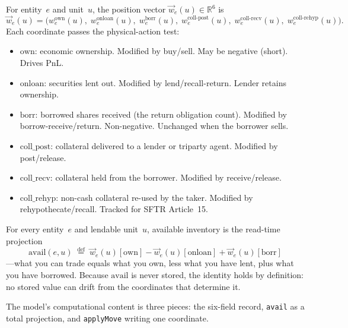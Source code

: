 \begin{definition}
\label{def:position-vector-gpm}
For entity~$e$ and unit~$u$, the position vector $\vec{w}_e(u) \in \mathbb{R}^6$ is
\[
\vec{w}_e(u) = \bigl(
  w^{\mathrm{own}}_e(u),\;
  w^{\mathrm{onloan}}_e(u),\;
  w^{\mathrm{borr}}_e(u),\;
  w^{\mathrm{coll\text{-}post}}_e(u),\;
  w^{\mathrm{coll\text{-}recv}}_e(u),\;
  w^{\mathrm{coll\text{-}rehyp}}_e(u)
\bigr).
\]
Each coordinate passes the physical-action test:
\begin{itemize}[nosep]
\item $\mathrm{own}$: economic ownership. Modified by buy/sell. May be negative (short). Drives PnL.
\item $\mathrm{onloan}$: securities lent out. Modified by lend\slash recall-return. Lender retains ownership.
\item $\mathrm{borr}$: borrowed shares received (the return obligation count). Modified by borrow-receive\slash return. Non-negative. Unchanged when the borrower sells.
\item $\mathrm{coll\_post}$: collateral delivered to a lender or triparty agent. Modified by post\slash release.
\item $\mathrm{coll\_recv}$: collateral held from the borrower. Modified by receive\slash release.
\item $\mathrm{coll\_rehyp}$: non-cash collateral re-used by the taker. Modified by rehypothecate/recall. Tracked for SFTR Article~15.
\end{itemize}
\end{definition}

\begin{definition}
\label{def:avail-projection}
For every entity~$e$ and lendable unit~$u$, available inventory is the read-time projection
\[
\mathrm{avail}(e,u) \;\stackrel{\mathrm{def}}{=}\; \vec{w}_e(u)[\mathrm{own}] - \vec{w}_e(u)[\mathrm{onloan}] + \vec{w}_e(u)[\mathrm{borr}]
\]
---what you can trade equals what you own, less what you have lent, plus what you have borrowed. Because $\mathrm{avail}$ is never stored, the identity holds by definition: no stored value can drift from the coordinates that determine it.
\end{definition}

The model's computational content is three pieces: the six-field record, \verb|avail| as a total projection, and \verb|applyMove| writing one coordinate.

